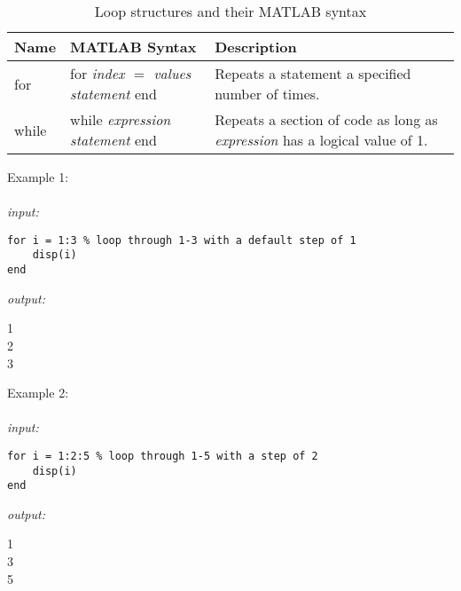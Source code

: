 \documentclass[../MATLAB_Primer.tex]{subfiles}
\begin{document}
\begin{table}[H]
    \caption{Loop structures and their MATLAB syntax}
    \begin{center}
        \begin{tabular}{| C{1.5cm} |m{3cm} | m{8cm}|}
            \hline
            \textbf{Name} & \textbf{MATLAB Syntax} & \textbf{Description}\\
            \hline
            for & for \textit{index $=$ values} \newline \text{ } \textit{statement} \newline end & Repeats a statement a specified number of times.\\
            \hline
            while & while \textit{expression} \newline \text{ } \textit{statement} \newline end & Repeats a section of code as long as \textit{expression} has a logical value of 1.\\
            \hline 
            
        \end{tabular}
    \label{tab:loops}
    \end{center}
\end{table}

Example 1:
\\ \\
\textit{input:}
\begin{lstlisting}[frame=single]
for i = 1:3 % loop through 1-3 with a default step of 1
    disp(i)
end
\end{lstlisting}

\textit{output:}

\begin{center}
    1\\ 2\\ 3\\
\end{center}

Example 2:
\\ \\
\textit{input:}
\begin{lstlisting}[frame=single]
for i = 1:2:5 % loop through 1-5 with a step of 2
    disp(i)
end
\end{lstlisting}

\textit{output:}

\begin{center}
    1\\ 3\\ 5\\
\end{center}
\end{document}
